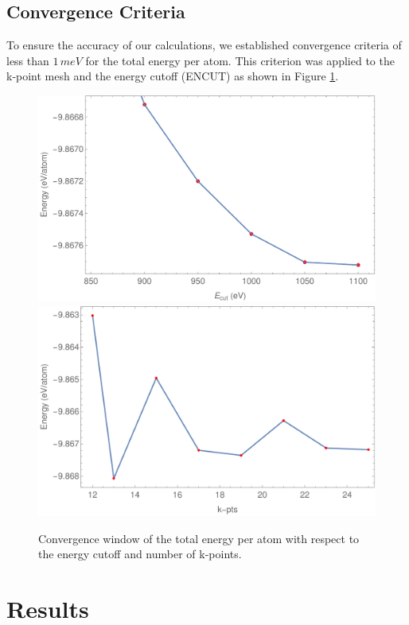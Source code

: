 \documentclass{article}
\begin{document}
\subsection{Convergence Criteria}
To ensure the accuracy of our calculations, we established convergence criteria of less than $1 \, meV$ for the total energy per atom. This criterion was applied to the k-point mesh and the energy cutoff (ENCUT) as shown in Figure \ref{fig:convergence}.

\begin{figure}[H]
    \centering
    \includegraphics[scale=0.35]{../figures/p_encut.pdf}
    \includegraphics[scale=0.35]{../figures/p_kp.pdf}
    \caption{Convergence window of the total energy per atom with respect to the energy cutoff and number of k-points.}
    \label{fig:convergence}
\end{figure}

\section{Results}
\end{document}
